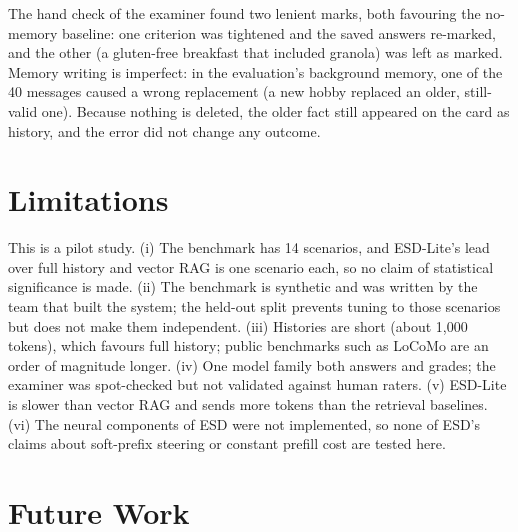 \documentclass[conference]{IEEEtran}
\begin{document}
The hand check of the examiner found two lenient marks, both favouring the no-memory baseline: one criterion was tightened and the saved answers re-marked, and the other (a gluten-free breakfast that included granola) was left as marked. Memory writing is imperfect: in the evaluation's background memory, one of the 40 messages caused a wrong replacement (a new hobby replaced an older, still-valid one). Because nothing is deleted, the older fact still appeared on the card as history, and the error did not change any outcome.

\section{Limitations}\label{sec_limits}
This is a pilot study. (i) The benchmark has 14 scenarios, and ESD-Lite's lead over full history and vector RAG is one scenario each, so no claim of statistical significance is made. (ii) The benchmark is synthetic and was written by the team that built the system; the held-out split prevents tuning to those scenarios but does not make them independent. (iii) Histories are short (about 1{,}000 tokens), which favours full history; public benchmarks such as LoCoMo are an order of magnitude longer. (iv) One model family both answers and grades; the examiner was spot-checked but not validated against human raters. (v) ESD-Lite is slower than vector RAG and sends more tokens than the retrieval baselines. (vi) The neural components of ESD were not implemented, so none of ESD's claims about soft-prefix steering or constant prefill cost are tested here.

\section{Future Work}\label{sec_future}
\end{document}
